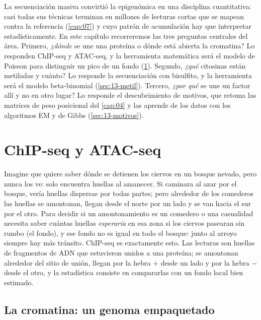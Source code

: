 La secuenciación masiva convirtió la epigenómica en una disciplina cuantitativa: casi todas sus técnicas terminan en millones de lecturas cortas que se mapean contra la referencia (\cref{cap:07}) y cuyo patrón de acumulación hay que interpretar estadísticamente. En este capítulo recorreremos las tres preguntas centrales del área. Primero, \emph{¿dónde} se une una proteína o dónde está abierta la cromatina? Lo responden ChIP-seq y ATAC-seq, y la herramienta matemática será el modelo de Poisson para distinguir un pico de un fondo (\cref{sec:13-chip}). Segundo, \emph{¿qué} citosinas están metiladas y cuánto? Lo responde la secuenciación con bisulfito, y la herramienta será el modelo beta-binomial (\cref{sec:13-metil}). Tercero, \emph{¿por qué} se une un factor allí y no en otro lugar? Lo responde el descubrimiento de motivos, que retoma las matrices de peso posicional del \cref{cap:04} y las aprende de los datos con los algoritmos EM y de Gibbs (\cref{sec:13-motivos}).

\section{ChIP-seq y ATAC-seq}\label{sec:13-chip}

\begin{intuicion}
Imagine que quiere saber dónde se detienen los ciervos en un bosque nevado, pero nunca los ve: solo encuentra huellas al amanecer. Si caminara al azar por el bosque, vería huellas dispersas por todas partes; pero alrededor de los comederos las huellas se amontonan, llegan desde el norte por un lado y se van hacia el sur por el otro. Para decidir si un amontonamiento es un comedero o una casualidad necesita saber cuántas huellas \emph{esperaría} en esa zona si los ciervos pasearan sin rumbo (el fondo), y ese fondo no es igual en todo el bosque: junto al arroyo siempre hay más tránsito. ChIP-seq es exactamente esto. Las lecturas son huellas de fragmentos de ADN que estuvieron unidos a una proteína; se amontonan alrededor del sitio de unión, llegan por la hebra $+$ desde un lado y por la hebra $-$ desde el otro, y la estadística consiste en compararlas con un fondo local bien estimado.
\end{intuicion}

\subsection{La cromatina: un genoma empaquetado}

